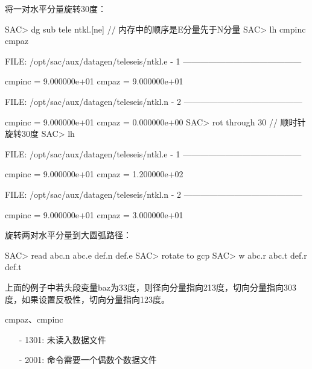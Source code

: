 将一对水平分量旋转30度：
\begin{SACCode}
SAC> dg sub tele ntkl.[ne]          // 内存中的顺序是E分量先于N分量
SAC> lh cmpinc cmpaz

  FILE: /opt/sac/aux/datagen/teleseis/ntkl.e - 1
 ------------------------------------------

     cmpinc = 9.000000e+01
      cmpaz = 9.000000e+01

  FILE: /opt/sac/aux/datagen/teleseis/ntkl.n - 2
 ------------------------------------------

     cmpinc = 9.000000e+01
      cmpaz = 0.000000e+00
SAC> rot through 30                 // 顺时针旋转30度
SAC> lh

  FILE: /opt/sac/aux/datagen/teleseis/ntkl.e - 1
 ------------------------------------------

     cmpinc = 9.000000e+01
      cmpaz = 1.200000e+02

  FILE: /opt/sac/aux/datagen/teleseis/ntkl.n - 2
 ------------------------------------------

     cmpinc = 9.000000e+01
      cmpaz = 3.000000e+01
\end{SACCode}

旋转两对水平分量到大圆弧路径：
\begin{SACCode}
SAC> read abc.n abc.e def.n def.e
SAC> rotate to gcp
SAC> w abc.r abc.t def.r def.t
\end{SACCode}
上面的例子中若头段变量baz为33度，则径向分量指向213度，切向分量指向303度，如果设置反极性，切向分量指向123度。

cmpaz、cmpinc

\begin{itemize}
\item[-]1301: 未读入数据文件
\item[-]2001: 命令需要一个偶数个数据文件
\end{itemize}
